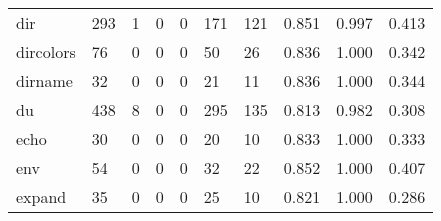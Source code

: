 \begin{longtable}{lp{2.0cm}p{2.0cm}p{2.0cm}p{2.0cm}p{2.0cm}p{2.0cm}p{2.0cm}p{2.0cm}p{2.0cm}}
dir       &                    293 &                                             1 &                                            0 &                                           0 &                                          171 &                                        121 &                                0.851 &                                  0.997 &                                0.413 \\
dircolors &                     76 &                                             0 &                                            0 &                                           0 &                                           50 &                                         26 &                                0.836 &                                  1.000 &                                0.342 \\
dirname   &                     32 &                                             0 &                                            0 &                                           0 &                                           21 &                                         11 &                                0.836 &                                  1.000 &                                0.344 \\
du        &                    438 &                                             8 &                                            0 &                                           0 &                                          295 &                                        135 &                                0.813 &                                  0.982 &                                0.308 \\
echo      &                     30 &                                             0 &                                            0 &                                           0 &                                           20 &                                         10 &                                0.833 &                                  1.000 &                                0.333 \\
env       &                     54 &                                             0 &                                            0 &                                           0 &                                           32 &                                         22 &                                0.852 &                                  1.000 &                                0.407 \\
expand    &                     35 &                                             0 &                                            0 &                                           0 &                                           25 &                                         10 &                                0.821 &                                  1.000 &                                0.286 \\

\end{longtable}
